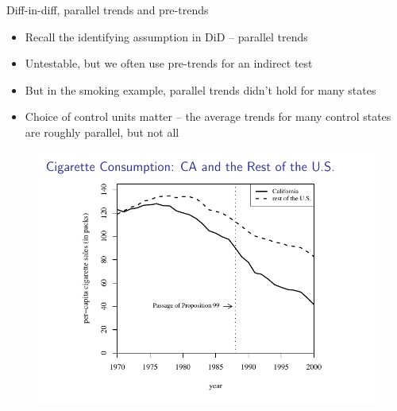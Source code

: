 \documentclass{beamer}
\begin{document}
\begin{frame}{Diff-in-diff, parallel trends and pre-trends}

\begin{itemize}
\item Recall the identifying assumption in DiD -- parallel trends
\item Untestable, but we often use pre-trends for an indirect test
\item But in the smoking example, parallel trends didn't hold for many states
\item Choice of control units matter -- the average trends for many control states are roughly parallel, but not all 
\end{itemize}

	
	\begin{figure}
	\includegraphics[scale=0.65]{./lecture_includes/abadie_3.pdf}
	\end{figure}


\end{frame}
\end{document}
